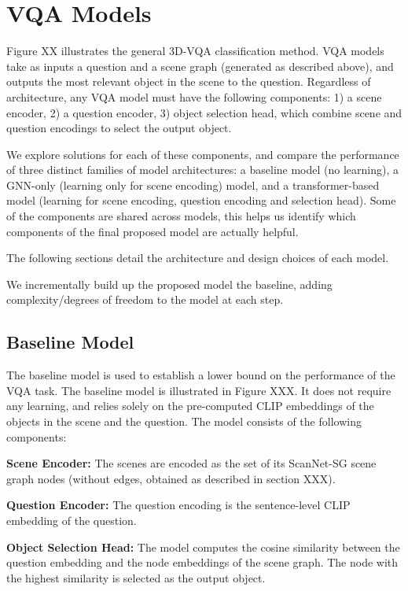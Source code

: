 \newpage
\section{VQA Models}

Figure XX illustrates the general 3D-VQA classification method. VQA models take as inputs a question and a scene graph (generated as described above), and outputs the most relevant object in the scene to the question. Regardless of architecture, any VQA model must have the following components: 1) a scene encoder, 2) a question encoder, 3) object selection head, which combine scene and question encodings to select the output object.

We explore solutions for each of these components, and compare the performance of three distinct families of model architectures: a baseline model (no learning), a GNN-only (learning only for scene encoding) model, and a transformer-based model (learning for scene encoding, question encoding and selection head). Some of the components are shared across models, this helps us identify which components of the final proposed model are actually helpful.

The following sections detail the architecture and design choices of each model.

We incrementally build up the proposed model the baseline, adding complexity/degrees of freedom to the model at each step.

\subsection{Baseline Model}
The baseline model is used to establish a lower bound on the performance of the VQA task. The baseline model is illustrated in Figure XXX. It does not require any learning, and relies solely on the pre-computed CLIP embeddings of the objects in the scene and the question. The model consists of the following components:

\textbf{Scene Encoder:} The scenes are encoded as the set of its ScanNet-SG scene graph nodes (without edges, obtained as described in section XXX).

\textbf{Question Encoder:} The question encoding is the sentence-level CLIP embedding of the question.

\textbf{Object Selection Head:} The model computes the cosine similarity between the question embedding and the node embeddings of the scene graph. The node with the highest similarity is selected as the output object.

